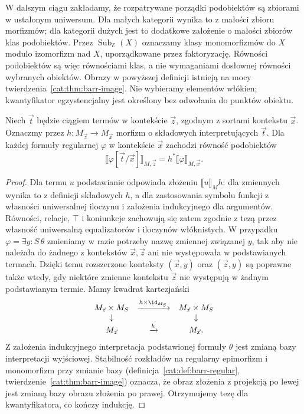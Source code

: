 W dalszym ciągu zakładamy, że rozpatrywane porządki podobiektów są zbiorami w ustalonym uniwersum. Dla małych kategorii wynika to z małości zbioru morfizmów; dla kategorii dużych jest to dodatkowe założenie o małości zbiorów klas podobiektów. Przez $\operatorname{Sub}_{\mathcal E}(X)$ oznaczamy klasy monomorfizmów do $X$ modulo izomorfizm nad $X$, uporządkowane przez faktoryzację. Równości podobiektów są więc równościami klas, a nie wymaganiami dosłownej równości wybranych obiektów. Obrazy w powyższej definicji istnieją na mocy twierdzenia~\ref{cat:thm:barr-image}. Nie wybieramy elementów włókien; kwantyfikator egzystencjalny jest określony bez odwołania do punktów obiektu.

\begin{stwierdzenie}\label{cat:prop:cl-substitution}
Niech $\vec t$ będzie ciągiem termów w kontekście $\vec z$, zgodnym z sortami kontekstu $\vec x$. Oznaczmy przez $h:M_{\vec z}\to M_{\vec x}$ morfizm o składowych interpretujących $\vec t$. Dla każdej formuły regularnej $\varphi$ w kontekście $\vec x$ zachodzi równość podobiektów
\[
 \llbracket\varphi[\vec t/\vec x]\rrbracket_{M,\vec z}
 =h^*\llbracket\varphi\rrbracket_{M,\vec x}.
\]
\end{stwierdzenie}
\begin{proof}
Dla termu $u$ podstawianie odpowiada złożeniu $\llbracket u\rrbracket_M h$: dla zmiennych wynika to z definicji składowych $h$, a dla zastosowania symbolu funkcji z własności uniwersalnej iloczynu i założenia indukcyjnego dla argumentów. Równości, relacje, $\top$ i koniunkcje zachowują się zatem zgodnie z tezą przez własność uniwersalną equalizatorów i iloczynów włóknistych. W przypadku $\varphi=\exists y:S\,\theta$ zmieniamy w razie potrzeby nazwę zmiennej związanej $y$, tak aby nie należała do żadnego z kontekstów $\vec x,\vec z$ ani nie występowała w podstawianych termach. Dzięki temu rozszerzone konteksty $(\vec x,y)$ oraz $(\vec z,y)$ są poprawne także wtedy, gdy niektóre zmienne kontekstu $\vec z$ nie występują w żadnym podstawianym termie. Mamy kwadrat kartezjański
\[
\begin{array}{ccc}
 M_{\vec z}\times M_S&\xrightarrow{h\times\id_{M_S}}&M_{\vec x}\times M_S\\
 \downarrow&&\downarrow\\
 M_{\vec z}&\xrightarrow{h}&M_{\vec x}.
\end{array}
\]
Z założenia indukcyjnego interpretacja podstawionej formuły $\theta$ jest zmianą bazy interpretacji wyjściowej. Stabilność rozkładów na regularny epimorfizm i monomorfizm przy zmianie bazy (definicja~\ref{cat:def:barr-regular}, twierdzenie~\ref{cat:thm:barr-image}) oznacza, że obraz złożenia z projekcją po lewej jest zmianą bazy obrazu złożenia po prawej. Otrzymujemy tezę dla kwantyfikatora, co kończy indukcję.
\end{proof}


